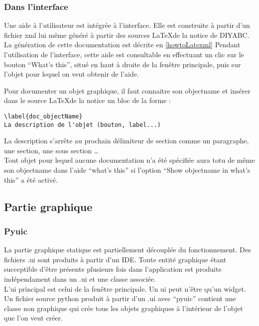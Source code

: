 \documentclass[12pt,a4paper]{article}
\begin{document}
    \subsubsection{Dans l'interface}
    Une aide à l'utilisateur est intégrée à l'interface. Elle est construite à
    partir d'un fichier xml lui même généré à partir des sources \LaTeX de la
    notice de DIYABC. La génération de cette documentation est décrite en 
    \ref{howtoLatexml}
    Pendant l'utilisation de l'interface, cette aide est
    consultable en effectuant un clic sur le bouton ``What's this'', situé en
    haut à droite de la fenêtre principale, puis sur l'objet pour lequel on veut
    obtenir de l'aide.

    Pour documenter un objet graphique, il faut connaitre son objectname et
    insérer dans le source \LaTeX de la notice 
    un bloc de la forme : 
    \begin{verbatim}\label{doc_objectName}
La description de l'objet (bouton, label...)\end{verbatim}
    La description s'arrête au prochain délimiteur de section comme un
    paragraphe, une section, une sous section \ldots \\

    Tout objet pour lequel aucune documentation n'a été spécifiée aura totu de
    même son objectname dans l'aide ``what's this'' si l'option ``Show objectname in what's
    this'' a été activé.


    \subsection{Partie graphique}
    \subsubsection{Pyuic}
        La partie graphique statique est partiellement découplée du
        fonctionnement. Des
        fichiers .ui sont produits à partir d'un IDE. Toute entité graphique
        étant succeptible d'être présente plusieurs fois dans l'application est
        produite indépendament dans un .ui et une classe associée.\\
        
        L'ui principal est celui de la fenêtre principale.  Un ui peut n'être
        qu'un widget. Un fichier source python produit à partir d'un .ui avec
        ``pyuic'' contient une classe non graphique qui crée tous les objets
        graphiques à l'intérieur de l'objet que l'on veut créer.\\
\end{document}
